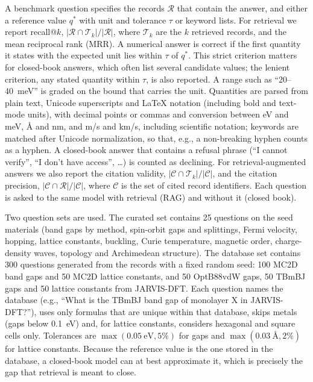 \documentclass[prmaterials,twocolumn,superscriptaddress,longbibliography,nofootinbib]{revtex4-2}
\begin{document}
A benchmark question specifies the records $\mathcal R$ that contain the answer, and either
a reference value $q^\ast$ with unit and tolerance $\tau$ or keyword lists. For retrieval we
report recall@$k$, $|\mathcal R\cap\mathcal T_k|/|\mathcal R|$, where $\mathcal T_k$ are the
$k$ retrieved records, and the mean reciprocal rank (MRR). A numerical answer is correct if
the first quantity it states with the expected unit lies within $\tau$ of $q^\ast$. This
strict criterion matters for closed-book answers, which often list several candidate values;
the lenient criterion, any stated quantity within $\tau$, is also reported. A range such as
``20--40~meV'' is graded on the bound that carries the unit. Quantities are parsed from plain
text, Unicode superscripts and \LaTeX{} notation (including bold and text-mode units), with
decimal points or commas and conversion between eV and meV, \AA{} and nm, and m/s and km/s,
including scientific notation; keywords are matched after Unicode normalization, so that,
e.g., a non-breaking hyphen counts as a hyphen. A closed-book answer that contains a refusal
phrase (``I cannot verify'', ``I don't have access'', \ldots) is counted as declining.
For retrieval-augmented answers we also report the citation validity,
$|\mathcal C\cap\mathcal T_k|/|\mathcal C|$, and the citation precision,
$|\mathcal C\cap\mathcal R|/|\mathcal C|$, where $\mathcal C$ is the set of cited record
identifiers. Each question is asked to the same model with retrieval (RAG) and without it
(closed book).

Two question sets are used. The curated set contains 25 questions on the seed materials
(band gaps by method, spin-orbit gaps and splittings, Fermi velocity, hopping, lattice
constants, buckling, Curie temperature, magnetic order, charge-density waves, topology and
Archimedean structure). The database set contains 300 questions generated from the records
with a fixed random seed: 100 MC2D band gaps and 50 MC2D lattice constants, and 50
OptB88vdW gaps, 50 TBmBJ gaps and 50 lattice constants from JARVIS-DFT. Each question names
the database (e.g., ``What is the TBmBJ band gap of monolayer X in JARVIS-DFT?''), uses only
formulas that are unique within that database, skips metals (gaps below 0.1~eV) and, for
lattice constants, considers hexagonal and square cells only. Tolerances are
$\max(0.05~\text{eV}, 5\%)$ for gaps and $\max(0.03~\text{\AA}, 2\%)$ for lattice constants.
Because the reference value is the one stored in the database, a closed-book model can at
best approximate it, which is precisely the gap that retrieval is meant to close.
\end{document}
